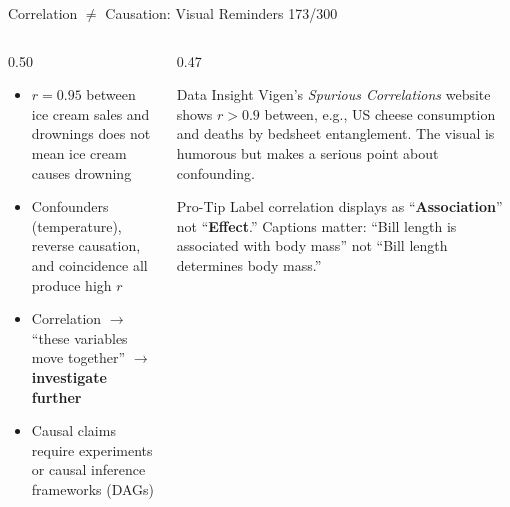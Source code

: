 \documentclass[10pt]{beamer}
\newcommand{\smark}[1]{\hfill{\scriptsize\color{codegray}#1}}
\begin{document}
\begin{frame}{Correlation $\neq$ Causation: Visual Reminders}
\smark{173/300}
\begin{columns}[T]
\begin{column}{0.50\textwidth}
\begin{itemize}
    \item $r = 0.95$ between ice cream sales and drownings does not mean ice cream causes drowning
    \item Confounders (temperature), reverse causation, and coincidence all produce high $r$
    \item Correlation $\to$ ``these variables move together'' $\to$ \textbf{investigate further}
    \item Causal claims require experiments or causal inference frameworks (DAGs)
\end{itemize}
\end{column}
\begin{column}{0.47\textwidth}
\begin{exampleblock}{Data Insight}
    \scriptsize Vigen's \textit{Spurious Correlations} website shows $r > 0.9$ between, e.g., US cheese consumption and deaths by bedsheet entanglement. The visual is humorous but makes a serious point about confounding.
\end{exampleblock}
\vspace{0.1cm}
\begin{alertblock}{Pro-Tip}
    \scriptsize Label correlation displays as ``\textbf{Association}'' not ``\textbf{Effect}.'' Captions matter: ``Bill length is associated with body mass'' not ``Bill length determines body mass.''
\end{alertblock}
\end{column}
\end{columns}
\end{frame}
\end{document}
